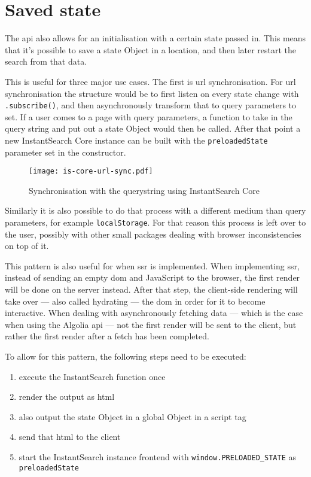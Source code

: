 
\section{Saved state} %
\label{sec:saved_state}

The \acrshort{api} also allows for an initialisation with a certain state passed in. This means that it's possible to save a state Object in a location, and then later restart the search from that data. 

This is useful for three major use cases. The first is \acrshort{url} synchronisation. For \acrshort{url} synchronisation the structure would be to first listen on every state change with {\tt .subscribe()}, and then asynchronously transform that to query parameters to set. If a user comes to a page with query parameters, a function to take in the query string and put out a state Object would then be called. After that point a new InstantSearch Core instance can be built with the {\tt preloadedState} parameter set in the constructor.

\begin{figure}[H]
  \centering
  \texttt{[image: is-core-url-sync.pdf]}
  \caption{Synchronisation with the querystring using InstantSearch Core}
  \label{figure:is-core-url-sync}
\end{figure}

Similarly it is also possible to do that process with a different medium than query parameters, for example {\tt localStorage}. For that reason this process is left over to the user, possibly with other small packages dealing with browser inconsistencies on top of it. 

This pattern is also useful for when \acrfull{ssr} is implemented. When implementing \acrlong{ssr}, instead of sending an empty \acrshort{dom} and JavaScript to the browser, the first render will be done on the server instead. After that step, the client-side rendering will take over --- also called hydrating --- the \acrshort{dom} in order for it to become interactive. When dealing with asynchronously fetching data --- which is the case when using the Algolia \acrshort{api} --- not the first render will be sent to the client, but rather the first render after a fetch has been completed.

To allow for this pattern, the following steps need to be executed:

\begin{enumerate}
  \item execute the InstantSearch function once
  \item render the output as \acrshort{html}
  \item also output the state Object in a global Object in a script tag
  \item send that \acrshort{html} to the client
  \item start the InstantSearch instance frontend with {\tt window.PRELOADED\_STATE} as {\tt preloadedState}
\end{enumerate}

